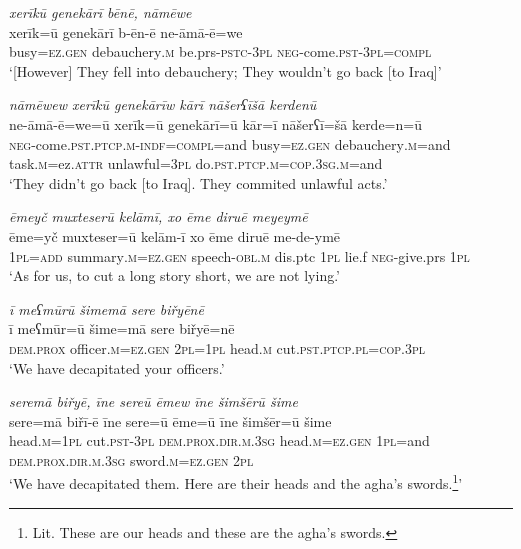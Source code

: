 \ea \label{BP.93}
\textit{xerīkū genekārī bēnē, nāmēwe} \\ 
\gll xerīk=ū genekārī b-ēn-ē ne-āmā-ē=we \\ 
 busy\textsc{=ez.gen} debauchery\textsc{.m} be.prs\textsc{-pstc}\textsc{-3pl} \textsc{neg-}come\textsc{.pst}\textsc{-3pl}\textsc{=compl} \\ 
\glt `[However] They fell into debauchery; They wouldn’t go back [to Iraq]'
\z 
 
\ea \label{BP.94}
\textit{nāmēwew xerīkū genekārīw kārī nāšerʕīšā kerdenū} \\ 
\gll ne-āmā-ē=we=ū xerīk=ū genekārī=ū kār=ī nāšerʕī=šā kerde=n=ū \\ 
 \textsc{neg-}come\textsc{.pst}\textsc{.ptcp}\textsc{.m}\textsc{-indf}\textsc{=compl}=and busy\textsc{=ez.gen} debauchery\textsc{.m}=and task\textsc{.m}=ez.\textsc{attr} unlawful\textsc{=3pl} do\textsc{.pst}\textsc{.ptcp}\textsc{.m}\textsc{=cop}\textsc{.3sg}\textsc{.m}=and \\ 
\glt `They didn’t go back [to Iraq]. They commited unlawful acts.'
\z 
 
\ea \label{BP.95}
\textit{ēmeyč muxteserū kelāmī, xo ēme diruē meyeymē} \\ 
\gll ēme=yč muxteser=ū kelām-ī xo ēme diruē me-de-ymē \\ 
 \textsc{1pl}\textsc{=add} summary\textsc{.m}\textsc{=ez.gen} speech\textsc{-obl}\textsc{.m} dis.ptc \textsc{1pl} lie.f \textsc{neg-}give.prs \textsc{1pl} \\ 
\glt `As for us, to cut a long story short, we are not lying.'
\z 
 
\ea \label{BP.96}
\textit{ī meʕmūrū šimemā sere biřyēnē} \\ 
\gll ī meʕmūr=ū šime=mā sere biřyē=nē \\ 
 \textsc{dem.prox} officer\textsc{.m}\textsc{=ez.gen} \textsc{2pl}\textsc{=\textsc{1pl}} head\textsc{.m} cut\textsc{.pst}\textsc{.ptcp}\textsc{.pl}\textsc{=cop}\textsc{.3pl} \\ 
\glt `We have decapitated your officers.'
\z 
 
\ea \label{BP.97}
\textit{seremā biřyē, īne sereū ēmew īne šimšērū šime} \\ 
\gll sere=mā biřī-ē īne sere=ū ēme=ū īne šimšēr=ū šime \\ 
 head\textsc{.m}\textsc{=\textsc{1pl}} cut\textsc{.pst}\textsc{-3pl} \textsc{dem.prox}\textsc{.dir}\textsc{.m}\textsc{.3sg} head\textsc{.m}\textsc{=ez.gen} \textsc{1pl}=and \textsc{dem.prox}\textsc{.dir}\textsc{.m}\textsc{.3sg} sword\textsc{.m}\textsc{=ez.gen} \textsc{2pl} \\ 
\glt `We have decapitated them. Here are their heads and the agha’s swords.\footnote{Lit. These are our heads and these are the agha’s swords.}'
\z 
 
